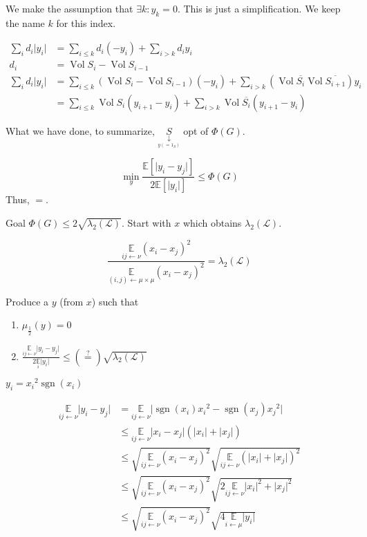 \documentclass[12pt]{article}
\newcommand{\EE}{\mathbb{E}}
\renewcommand{\L}{\mathcal{L}}
\newcommand{\la}{\leftarrow}
\newcommand{\esp}[2][]{\underset{#1}{\EE}\left[ #2 \right]}
\DeclareMathOperator{\vol}{Vol}
\DeclareMathOperator{\sgn}{sgn}
\begin{document}

We make the assumption that $\exists k : y_k = 0$. This is just a simplification. We keep the name $k$ for this index.

\[
    \begin{aligned}
        \sum\limits_i d_i\lvert y_i \rvert &= \sum\limits_{i\leqslant k} d_i(-y_i) + \sum\limits_{i > k}d_i y_i\\
       d_i &= \vol S_i - \vol S_{i-1}\\
       \sum\limits_i d_i\lvert y_i \rvert &= \sum\limits_{i\leqslant k} (\vol S_i - \vol S_{i-1})(-y_i) + \sum\limits_{i>k} \left(\vol \overline{S_i} \vol \overline{S_{i+1}} \right)y_i\\
       &= \sum\limits_{i\leqslant k} \vol S_i (y_{i+1} -y_i) + \sum\limits_{i>k} \vol \overline{S_i} (y_{i+1} - y_i)
    \end{aligned}
\]

What we have done, to summarize, $\underset{\underset{y(=1_S)}{\downarrow}}{S}$ opt of $\Phi(G)$.

\[
    \min\limits_y \frac{\esp{\lvert y_i-y_j\rvert}}{2\esp{\lvert y_i \rvert}} \leqslant \Phi(G)
\]
Thus, $=$.

Goal $\Phi(G) \leqslant 2\sqrt{\lambda_2(\L)}$. Start with $x$ which obtains $\lambda_2(\L)$.

\[
    \frac{\underset{ij\la \nu}{\EE}(x_i-x_j)^2}{\underset{(i,j)\la\mu\times\mu}{\EE}(x_i-x_j)^2} = \lambda_2(\L)
\]

Produce a $y$ (from $x$) such that
\begin{enumerate}[(1)]
    \item $\mu_{\frac{1}{2}}(y) = 0$
    \item $\frac{\underset{ij\la\nu}{\EE}\lvert y_i-y_j\rvert}{2\underset{i}{\EE}\lvert y_i \rvert} \leqslant (\overset{?}{=}) \sqrt{\lambda_2(\L)}$
\end{enumerate}

$y_i = {x_i}^2 \sgn(x_i)$

\[
    \begin{aligned}
        \underset{ij\la\nu}{\EE} \lvert y_i - y_j \rvert &= \underset{ij \la \nu}{\EE} \lvert \sgn(x_i){x_i}^2 - \sgn(x_j){x_j}^2\rvert\\
        &\leqslant \underset{ij\la \nu}{\EE} \lvert x_i-x_j \rvert(\lvert x_i \rvert + \lvert x_j \rvert)\\
        &\leqslant \sqrt{\underset{ij\la\nu}{\EE}(x_i-x_j)^2} \sqrt{\underset{ij\la \nu}{\EE} (\lvert x_i \rvert + \lvert x_j \rvert)^2}\\
        &\leqslant \sqrt{\underset{ij\la\nu}{\EE}(x_i-x_j)^2} \sqrt{2\underset{ij\la \nu}{\EE} \lvert x_i \rvert^2 + \lvert x_j \rvert^2}\\
        &\leqslant \sqrt{\underset{ij\la\nu}{\EE}(x_i-x_j)^2} \sqrt{4\underset{i\la \mu}{\EE} \lvert y_i \rvert}
    \end{aligned}
\]
\end{document}
